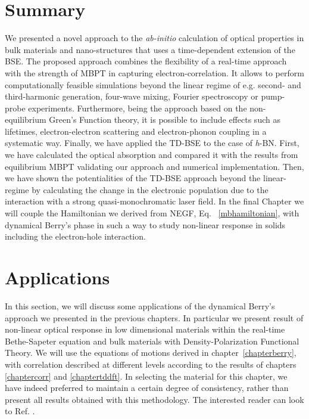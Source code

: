 \section{Summary}
We presented a novel approach to the \emph{ab-initio} calculation of
optical properties in bulk materials and nano-structures that uses a
time-dependent extension of the BSE.  
The proposed approach combines the flexibility of a real-time approach
with the strength of MBPT in capturing electron-correlation.  It
allows to perform computationally feasible simulations beyond the
linear regime of e.g. second- and third-harmonic
generation, four-wave mixing, Fourier spectroscopy or pump-probe experiments.
Furthermore, being the approach based on the non-equilibrium Green's Function theory, it is possible to
include effects such as lifetimes, electron-electron
scattering\cite{bsedynamic} and electron-phonon
coupling\cite{PhysRevLett.101.106405} in a systematic way. 
Finally, we have applied the TD-BSE to the case of {\it h}-BN. First, we have calculated
the optical absorption and compared it with the results from equilibrium
MBPT validating our approach and numerical
implementation. Then, we have shown the potentialities of the TD-BSE approach beyond the linear-regime 
by calculating the change in the electronic population due to the interaction with a strong quasi-monochromatic laser field. In the final Chapter we will couple the Hamiltonian we derived from NEGF, Eq. ~\ref{mbhamiltonian}, with dynamical Berry's phase in such a way to study non-linear response in solids including the electron-hole interaction. 


\section{Applications}
\label{chapterappli}
In this section, we will discuss some applications of the dynamical Berry's approach we presented in the previous chapters. In particular we present result of  non-linear optical response in low dimensional materials within the real-time Bethe-Sapeter equation and bulk materials with Density-Polarization Functional Theory.
We will use the equations of motions derived in chapter~\ref{chapterberry}, with correlation described at different levels according to the results of chapters \ref{chaptercorr} and \ref{chaptertddft}.
In selecting the material for this chapter, we have indeed preferred to maintain a certain degree of consistency, rather than present all results obtained with this methodology. The interested reader can look to Ref. \cite{gruningtddf2,attaccalite2015strong,PhysRevB.89.081102,gruningtddf1,attaccalite1d}.
